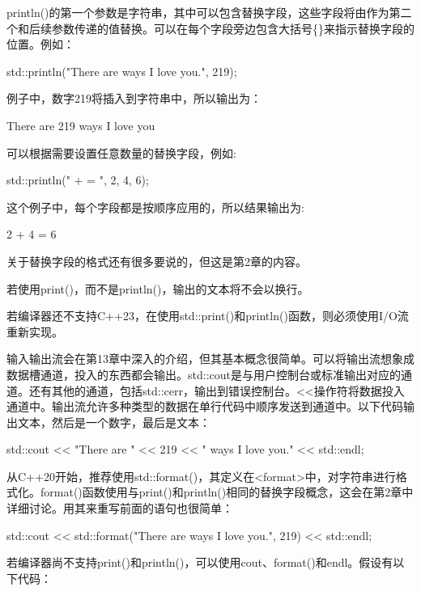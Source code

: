 println()的第一个参数是字符串，其中可以包含替换字段，这些字段将由作为第二个和后续参数传递的值替换。可以在每个字段旁边包含大括号\{\}来指示替换字段的位置。例如：

\begin{cpp}
std::println("There are {} ways I love you.", 219);
\end{cpp}

例子中，数字219将插入到字符串中，所以输出为：

\begin{shell}
There are 219 ways I love you
\end{shell}

可以根据需要设置任意数量的替换字段，例如:

\begin{cpp}
std::println("{} + {} = {}", 2, 4, 6);
\end{cpp}

这个例子中，每个字段都是按顺序应用的，所以结果输出为:

\begin{shell}
2 + 4 = 6
\end{shell}

关于替换字段的格式还有很多要说的，但这是第2章的内容。

若使用print()，而不是println()，输出的文本将不会以换行。


若编译器还不支持C++23，在使用std::print()和println()函数，则必须使用I/O流重新实现。

输入输出流会在第13章中深入的介绍，但其基本概念很简单。可以将输出流想象成数据槽通道，投入的东西都会输出。std::cout是与用户控制台或标准输出对应的通道。还有其他的通道，包括std::cerr，输出到错误控制台。<{}<操作符将数据投入通道中。输出流允许多种类型的数据在单行代码中顺序发送到通道中。以下代码输出文本，然后是一个数字，最后是文本：

\begin{cpp}
std::cout << "There are " << 219 << " ways I love you." << std::endl;
\end{cpp}

从C++20开始，推荐使用std::format()，其定义在<format>中，对字符串进行格式化。format()函数使用与print()和println()相同的替换字段概念，这会在第2章中详细讨论。用其来重写前面的语句也很简单：

\begin{cpp}
std::cout << std::format("There are {} ways I love you.", 219) << std::endl;
\end{cpp}

若编译器尚不支持print()和println()，可以使用cout、format()和endl。假设有以下代码：

